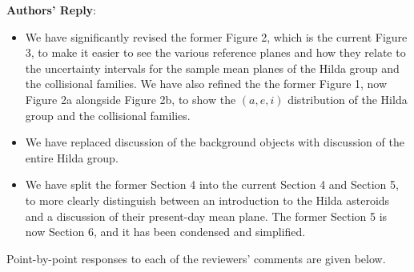 \documentclass[11pt]{article}
\newcounter{reviewer}
\newcounter{point}[reviewer]
\newenvironment{reply}
   {\medskip \noindent \begin{sf}\textbf{Authors' Reply}:\  }
   {\medskip \end{sf}\medskip}
\begin{document}
\begin{reply}
\begin{itemize}
\item We have significantly revised the former Figure 2, which is the current Figure 3, to make it easier to see the various reference planes and how they relate to the uncertainty intervals for the sample mean planes of the Hilda group and the collisional families. We have also refined the the former Figure 1, now  Figure 2a alongside Figure 2b, to show the $(a,e,i)$ distribution of the Hilda group and the collisional families.
\item We have replaced discussion of the background objects with discussion of the entire Hilda group. %
\item We have split the former Section 4 into the current Section 4 and Section 5, to more clearly distinguish between an introduction to the Hilda asteroids and a discussion of their present-day mean plane. The former Section 5 is now Section 6, and it has been condensed and simplified.
\end{itemize}
Point-by-point responses to each of the reviewers’ comments are given below.
\end{reply}
\end{document}
